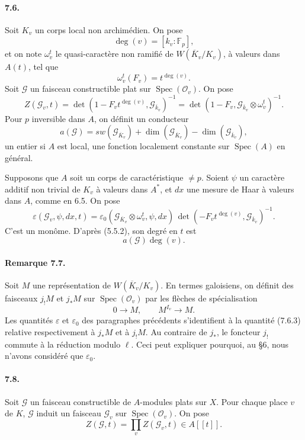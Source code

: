 \documentclass[10pt,letterpaper]{article}
\newcommand{\F}{\mathbb F}
\newcommand{\Spec}{\operatorname{Spec}}
\providecommand{\Spec}{\operatorname{Spec}}
\providecommand{\Spec}{\operatorname{Spec}}
\providecommand{\Spec}{\operatorname{Spec}}
\begin{document}
\paragraph{7.6.} Soit \(K_v\) un corps local non archimédien. On pose
\[
\deg(v)=[k_v:\F_p],
\]
et on note \(\omega_v^t\) le quasi-caractère non ramifié de \(W(\overline K_v/K_v)\), à valeurs dans \(A(t)\), tel que
\[
\omega_v^t(F_v)=t^{\deg(v)}.
\]
Soit \(\mathcal G\) un faisceau constructible plat sur \(\Spec(\mathcal O_v)\). On pose
\[
\tag{7.6.1}
Z(\mathcal G_v,t)
=
\det(1-F_vt^{\deg(v)},\mathcal G_{\overline k_v})^{-1}
=
\det(1-F_v,\mathcal G_{\overline k_v}\otimes\omega_v^t)^{-1}.
\]
Pour \(p\) inversible dans \(A\), on définit un conducteur
\[
\tag{7.6.2}
a(\mathcal G)=sw(\mathcal G_{\overline K_v})+
\dim(\mathcal G_{\overline K_v})-\dim(\mathcal G_{\overline k_v}),
\]
un entier si \(A\) est local, une fonction localement constante sur \(\Spec(A)\) en général.

Supposons que \(A\) soit un corps de caractéristique \(\ne p\). Soient \(\psi\) un caractère additif non trivial de \(K_v\) à valeurs dans \(A^*\), et \(dx\) une mesure de Haar à valeurs dans \(A\), comme en 6.5. On pose
\[
\tag{7.6.3}
\varepsilon(\mathcal G_v,\psi,dx,t)
=
\varepsilon_0(\mathcal G_{\overline K_v}\otimes\omega_v^t,\psi,dx)\,
\det(-F_vt^{\deg(v)},\mathcal G_{\overline k_v})^{-1}.
\]
C'est un monôme. D'après (5.5.2), son degré en \(t\) est
\[
a(\mathcal G)\deg(v).
\]

\paragraph{Remarque 7.7.} Soit \(M\) une représentation de \(W(\overline K_v/K_v)\). En termes galoisiens, on définit des faisceaux \(j_!M\) et \(j_*M\) sur \(\Spec(\mathcal O_v)\) par les flèches de spécialisation
\[
0\longrightarrow M,
\qquad
M^{I_v}\longrightarrow M.
\]
Les quantités \(\varepsilon\) et \(\varepsilon_0\) des paragraphes précédents s'identifient à la quantité (7.6.3) relative respectivement à \(j_*M\) et à \(j_!M\). Au contraire de \(j_*\), le foncteur \(j_!\) commute à la réduction modulo \(\ell\). Ceci peut expliquer pourquoi, au §6, nous n'avons considéré que \(\varepsilon_0\).

\paragraph{7.8.} Soit \(\mathcal G\) un faisceau constructible de \(A\)-modules plats sur \(X\). Pour chaque place \(v\) de \(K\), \(\mathcal G\) induit un faisceau \(\mathcal G_v\) sur \(\Spec(\mathcal O_v)\). On pose
\[
\tag{7.8.1}
Z(\mathcal G,t)=\prod_v Z(\mathcal G_v,t)\in A[[t]].
\]
\end{document}
